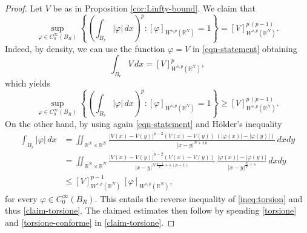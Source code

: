 \documentclass{amsart}
\theoremstyle{definition}
\numberwithin{equation}{section}
\begin{document}
\begin{proof}
	Let $V$ be as in Proposition \ref{cor:Linfty-bound}. We claim that 
	\begin{equation} \label{claim-torsione}
		\sup_{\varphi \in C^\infty_0(B_R)} \left\{\left(\displaystyle \int_{B_r} |\varphi|\,dx\right)^p: [\varphi]_{W^{s,p}(\mathbb{R}^N)} = 1 \right\} = [V]_{W^{s,p}(\mathbb{R}^N)}^{p\,(p-1)}.
	\end{equation}
	Indeed, by density, we can use the function $\varphi = V$ in \eqref{eqn-statement} obtaining
	\begin{equation} \label{eqn:from-el}
		\int_{B_r} V\,dx = [V]^p_{W^{s,p}(\mathbb{R}^N)},
	\end{equation} 
	which yields
	\begin{equation} \label{ineq:torsion}
		\sup_{\varphi \in C^\infty_0(B_R)} \left\{\left(\displaystyle \int_{B_r} |\varphi|\,dx\right)^p: [\varphi]_{W^{s,p}(\mathbb{R}^N)} = 1 \right\} \ge [V]_{W^{s,p}(\mathbb{R}^N)}^{p\,(p-1)}.
	\end{equation}
	On the other hand, by using again \eqref{eqn-statement} and H\"older's inequality  
	\[
	\begin{split}
		\int_{B_r} |\varphi|\,dx &=  \iint_{\mathbb{R}^N \times \mathbb{R}^N} \frac{|V(x) - V(y)|^{p-2}(V(x) - V(y))\,\left(|\varphi(x)| - |\varphi(y)|\right)}{|x-y|^{N+s\,p}}\,dxdy \\
		&= \iint_{\mathbb{R}^N \times \mathbb{R}^N} \frac{|V(x) - V(y)|^{p-2}(V(x) - V(y))}{|x-y|^{N\,\frac{p-1}{p} + s\,(p-1)}}\,\frac{|\varphi(x)| - |\varphi(y)|}{|x-y|^{\frac{N}{p}+s}}\,dxdy \\
		&\le [V]_{W^{s,p}(\mathbb{R}^N)}^{p-1}\,[\varphi]_{W^{s,p}(\mathbb{R}^N)}, 
	\end{split}
	\]
	for every $\varphi \in C^\infty_0(B_R)$. This entails the reverse inequality of \eqref{ineq:torsion} and thus \eqref{claim-torsione}. The claimed estimates then follow by spending \eqref{torsione} and \eqref{torsione-conforme} in \eqref{claim-torsione}.
\end{proof}
\end{document}
